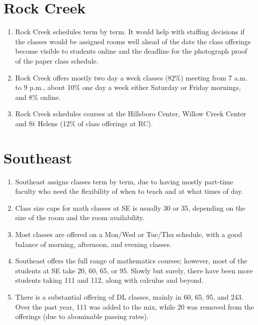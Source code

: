 \section*{Rock Creek}
\begin{enumerate}
    \item Rock Creek schedules term by term.  It would help with staffing
      decisions if the classes would be assigned rooms well ahead of the date
      the class offerings become visible to students online and the deadline
      for the photograph proof of the paper class schedule.
    \item Rock Creek offers mostly two day a week classes (82\%) meeting from
      7 {\sc a.m.} to 9  {\sc p.m.}, about 10\% one day a week either Saturday or Friday
      mornings, and 8\% online.
    \item Rock Creek schedules courses at the Hillsboro Center, Willow Creek
      Center and St Helens  (12\% of class offerings at RC).
\end{enumerate}

\section*{Southeast}
\begin{enumerate}
  \item Southeast assigns classes term by term, due to having mostly part-time
    faculty who need the flexibility of when to teach and at what times of day.
  \item Class size caps for math classes at SE is usually 30 or 35, depending
    on the size of the room and the room availability.  
  \item Most classes are offered on a Mon/Wed or Tue/Thu schedule, with a good
    balance of morning, afternoon, and evening classes.
  \item Southeast offers the full range of mathematics courses; however, most
    of the students at SE take 20, 60, 65, or 95.  Slowly but surely, there
    have been more students taking 111 and 112, along with calculus and beyond.
  \item There is a substantial offering of DL classes, mainly in 60, 65, 95,
    and 243.  Over the past year, 111 was added to the mix, while 20 was
    removed from the offerings (due to abominable passing rates).
\end{enumerate}


